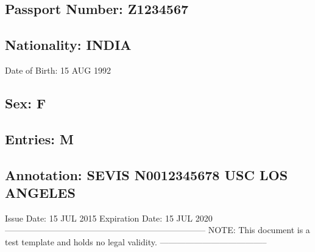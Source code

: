 \subsection*{Passport Number: Z1234567}

\subsection*{Nationality: INDIA}

Date of Birth: 15 AUG 1992

\subsection*{Sex: F}

\subsection*{Entries: M}

\subsection*{Annotation: SEVIS N0012345678 USC LOS ANGELES}

Issue Date: 15 JUL 2015 Expiration Date: 15 JUL 2020 ----------------------------------------------------------------------- NOTE: This document is a test template and holds no legal validity. --------------------------------------